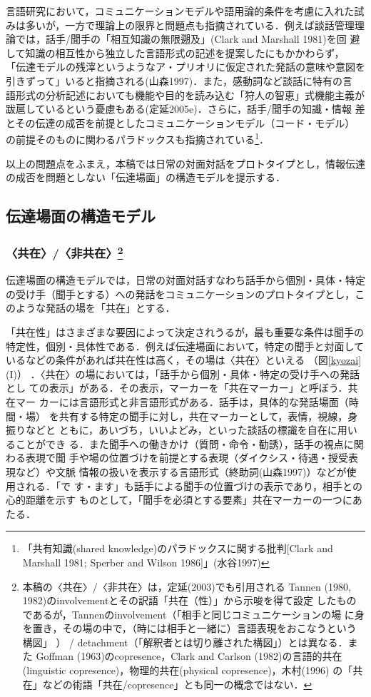 \documentclass[japanese]{jnlp_1.3c}
\begin{document}
言語研究において，コミュニケーションモデルや語用論的条件を考慮に入れた試
みは多いが，一方で理論上の限界と問題点も指摘されている．例えば談話管理理
論では，話手/聞手の「相互知識の無限遡及」(Clark and Marshall 1981)を回
避して知識の相互性から独立した言語形式の記述を提案したにもかかわらず，
「伝達モデルの残滓というようなア・プリオリに仮定された発話の意味や意図を
引きずって」いると指摘される(山森1997)．また，感動詞など談話に特有の言
語形式の分析記述においても機能や目的を読み込む「狩人の智恵」式機能主義が
跋扈しているという憂慮もある(定延2005e)．さらに，話手/聞手の知識・情報
差とその伝達の成否を前提としたコミュニケーションモデル（コード・モデル）
の前提そのものに関わるパラドックスも指摘されている\footnote{
	「共有知識(shared knowledge)のパラドックスに関する批判[Clark
	and Marshall 1981; Sperber and Wilson 1986]」(水谷1997)}．

以上の問題点をふまえ，本稿では日常の対面対話をプロトタイプとし，情報伝達
の成否を問題としない「伝達場面」の構造モデルを提示する．

\subsection{伝達場面の構造モデル}\label{submodel}

\subsubsection{〈共在〉/〈非共在〉\unskip\protect\footnote{
	本稿の〈共在〉/〈非共在〉は，定延(2003)でも引用される
	Tannen (1980, 1982)のinvolvementとその訳語「共在（性）」から示唆を得て設定
	したものであるが，Tannenのinvolvement（「相手と同じコミュニケーションの場
	に身を置き，その場の中で，（時には相手と一緒に）言語表現をおこなうという
	構図」
	）
	 / detachment（「解釈者とは切り離された構図」）とは異なる．また
	Goffman (1963)のcopresence，Clark and Carlson (1982)の言語的共在
	(linguistic copresence)，物理的共在(physical copresence)，木村(1996)
	の「共在」などの術語「共在/copresence」とも同一の概念ではない．}}

伝達場面の構造モデルでは，日常の対面対話すなわち話手から個別・具体・特定
の受け手（聞手とする）への発話をコミュニケーションのプロトタイプとし，こ
のような発話の場を「共在」とする．

「共在性」はさまざまな要因によって決定されうるが，最も重要な条件は聞手の
特定性，個別・具体性である．例えば伝達場面において，特定の聞手と対面して
いるなどの条件があれば共在性は高く，その場は〈共在〉といえる
（図\ref{kyozai}(I)）
．〈共在〉の場においては，「話手から個別・具体・特定の受け手への発話とし
ての表示」がある．その表示，マーカーを「共在マーカー」と呼ぼう．共在マー
カーには言語形式と非言語形式がある．話手は，具体的な発話場面（時間・場）
を共有する特定の聞手に対し，共在マーカーとして，表情，視線，身振りなどと
ともに，あいづち，いいよどみ，といった談話の標識を自在に用いることができ
る．また聞手への働きかけ（質問・命令・勧誘），話手の視点に関わる表現で聞
手や場の位置づけを前提とする表現（ダイクシス・待遇・授受表現など）や文脈
情報の扱いを表示する言語形式（終助詞(山森1997)）などが使用される．「で
す・ます」も話手による聞手の位置づけの表示であり，相手との心的距離を示す
ものとして，「聞手を必須とする要素」共在マーカーの一つにあたる．
\end{document}
